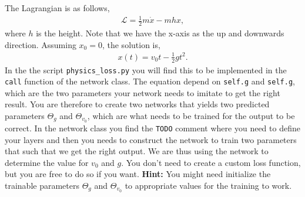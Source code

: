 \documentclass[12pt,a4paper]{article} %
\numberwithin{equation}{section}
\begin{document}
		The Lagrangian is as follows,
		\begin{gather}
			\mathcal{L} = \frac{1}{2} m \dot{x} - mhx,
		\end{gather}
		where $h$ is the height. Note that we have the x-axis as the up and downwards direction. Assuming $x_0=0$, the solution is,
		\begin{gather}
			x(t) = v_0 t - \frac{1}{2} g t^2.
		\end{gather}
		In the the script \texttt{physics\_loss.py} you will find this to be implemented in the \texttt{call} function of the network class. The equation depend on \texttt{self.g} and \texttt{self.g}, which are the two parameters your network needs to imitate to get the right result. You are therefore to create two networks that yields two predicted parameters $\Theta_g$ and $\Theta_{v_0}$, which are what needs to be trained for the output to be correct. In the network class you find the \texttt{TODO} comment where you need to define your layers and then you needs to construct the network to train two parameters that such that we get the right output. We are thus using the network to determine the value for $v_0$ and $g$. You don't need to create a custom loss function, but you are free to do so if you want.\newline
		\textbf{Hint:} You might need initialize the trainable parameters $\Theta_g$ and $\Theta_{v_0}$ to appropriate values for the training to work.\newline
		
	
\end{document}

